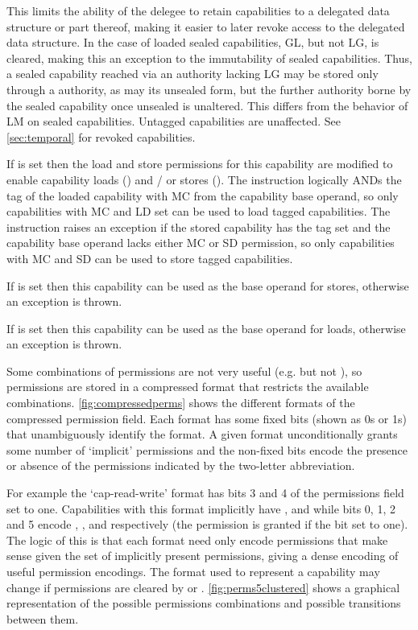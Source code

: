 \begin{description}
This limits the ability of the delegee to retain capabilities to a delegated data structure or part thereof, making it easier to later revoke access to the delegated data structure.
In the case of loaded sealed capabilities, GL, but not LG, is cleared, making this an exception to the immutability of sealed capabilities.
Thus, a sealed capability reached via an authority lacking LG may be stored only through a \cappermSLC authority,
as may its unsealed form, but the further authority borne by the sealed capability once unsealed is unaltered.
This differs from the behavior of LM on sealed capabilities.
Untagged capabilities are unaffected.
See \cref{sec:temporal} for revoked capabilities.
\item[MC] If \cappermMC is set then the load and store permissions for this capability are modified to enable capability loads (\cappermLC) and / or stores (\cappermSC).
The  instruction logically ANDs the tag of the loaded capability with MC from the capability base operand, so only capabilities with MC and LD set can be used to load tagged capabilities.
The  instruction raises an exception if the stored capability has the tag set and the capability base operand lacks either MC or SD permission, so only capabilities with MC and SD can be used to store tagged capabilities.
\item[SD] If \cappermS is set then this capability can be used as the base operand for stores, otherwise an exception is thrown.
\item[LD] If \cappermL is set then this capability can be used as the base operand for loads, otherwise an exception is thrown.
\end{description}

Some combinations of permissions are not very useful (e.g. \cappermASR but not \cappermX), so permissions are stored in a compressed format that restricts the available combinations.
\cref{fig:compressedperms} shows the different formats of the compressed permission field.
Each format has some fixed bits (shown as 0s or 1s) that unambiguously identify the format.
A given format unconditionally grants some number of `implicit' permissions and the non-fixed bits encode the presence or absence of the permissions indicated by the two-letter abbreviation.

For example the `cap-read-write' format has bits 3 and 4 of the permissions field set to one.
Capabilities with this format implicitly have \cappermL, \cappermMC and \cappermS while bits 0, 1, 2 and 5 encode \cappermILG, \cappermLM, \cappermSLC and \cappermG respectively (the permission is granted if the bit set to one).
The logic of this is that each format need only encode permissions that make sense given the set of implicitly present permissions, giving a dense encoding of useful permission encodings.
The format used to represent a capability may change if permissions are cleared by  or .
\cref{fig:perms5clustered} shows a graphical representation of the possible permissions combinations and possible transitions between them.

